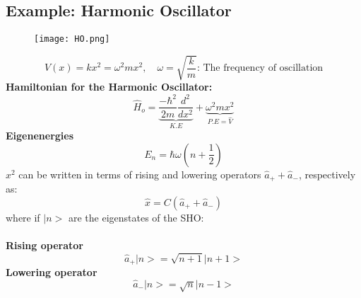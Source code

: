 \documentclass[12pt,fancychapters]{report}
\numberwithin{equation}{section}
\begin{document}
\subsection{Example: Harmonic Oscillator}
\begin{figure}[h]
  \centering
	\texttt{[image: HO.png]}
\end{figure}
\begin{equation*}
	V(x) = kx^2 = \omega^2 m x^2,\,\,\,\,\,\,\omega = \sqrt{\frac{k}{m}}:\,\text{The frequency of
	oscillation}
\end{equation*}
\textbf{Hamiltonian for the Harmonic Oscillator:}
\begin{equation*}
	\hat{H}_o =\underbrace{\frac{-\hbar^2}{2m}\frac{d^2}{dx^2}}_{K.E} + \underbrace{\omega^2 m x^2}_
	{P.E = \hat{V}}
\end{equation*}
\textbf{Eigenenergies}
\begin{equation*}
	E_n = \hbar\omega\left(n + \frac{1}{2}\right)
\end{equation*}
$x^2$ can be written in terms of rising and lowering operators $\hat{a}_+ + \hat{a}_-$, respectively
as:
\begin{equation*}
	\hat{x} =	C \left(\hat{a}_+ + \hat{a}_-\right)
\end{equation*}
where if $\big|n\big>$ are the eigenstates of the SHO:\\
\\
\textbf{Rising operator}
\begin{equation*}
	\hat{a}_+ \big|n\big> = \sqrt{n +1}\big|n+1\big>
\end{equation*}
\textbf{Lowering operator}
\begin{equation*}
	\hat{a}_- \big|n\big> = \sqrt{n}\big|n-1\big>
\end{equation*}
\end{document}
